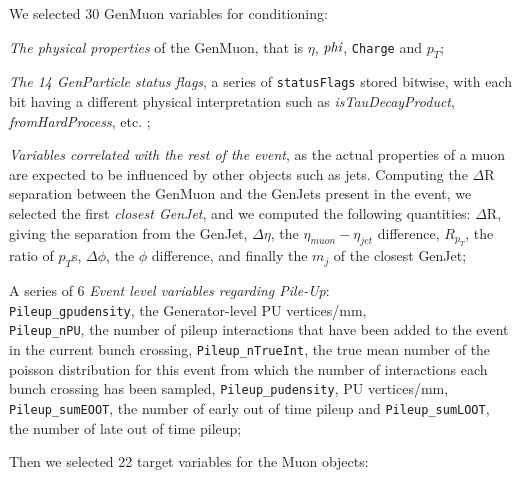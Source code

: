 We selected 30 GenMuon variables for conditioning:

\begin{outline}
\1 \emph{The physical properties} of the GenMuon, that is $\eta$, $\emph{phi}$, \texttt{Charge} and $p_T$;

\1 \emph{The 14 GenParticle status flags}, a series of \texttt{statusFlags} stored bitwise, with each bit having a different physical interpretation such as \emph{isTauDecayProduct}, \emph{fromHardProcess}, etc. ;

\1 \emph{Variables correlated with the rest of the event}, as the actual properties of a muon are expected to be influenced by other objects such as jets. Computing the $\Delta$R separation between the GenMuon and the GenJets present in the event, we selected the first \emph{closest GenJet}, and we computed the following quantities:
\2 $\Delta$R, giving the separation from the GenJet, $\Delta\eta$, the $\eta_{muon} - \eta_{jet}$ difference, $R_{p_T}$, the ratio of $p_T$s, $\Delta\phi$, the $\phi$ difference, and finally the $m_j$ of the closest GenJet;

\1 A series of 6 \emph{ Event level variables regarding Pile-Up}:\\ \texttt{Pileup\_gpudensity}, the Generator-level PU vertices/mm,\\ \texttt{Pileup\_nPU}, the number of pileup interactions that have been added to the event in the current bunch crossing, \texttt{Pileup\_nTrueInt}, the true mean number of the poisson distribution for this event from which the number of interactions each bunch crossing has been sampled, \texttt{Pileup\_pudensity}, PU vertices/mm, \texttt{Pileup\_sumEOOT}, the number of early out of time pileup and \texttt{Pileup\_sumLOOT}, the number of late out of time pileup;
\end{outline}

Then we selected 22 target variables for the Muon objects:

